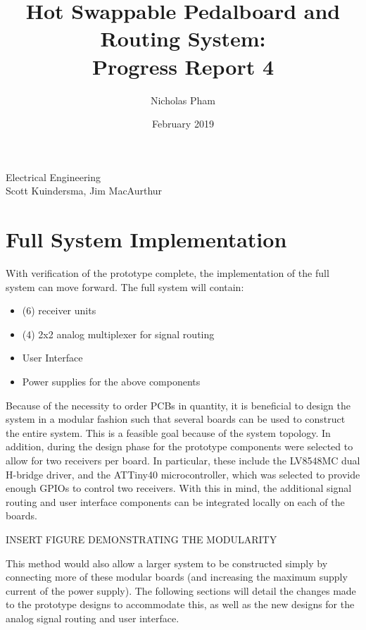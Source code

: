\documentclass{article}
\title{Hot Swappable Pedalboard and Routing System:\\Progress Report 4}
\author{Nicholas Pham}
\date{February 2019}
\begin{document}
\maketitle
\begin{center}
    Electrical Engineering \\
    Scott Kuindersma, Jim MacAurthur
\end{center}



% 
% 


\section{Full System Implementation}
	With verification of the prototype complete, the implementation of the full system can move forward.  The full system will contain:

	\begin{itemize}
		\item (6) receiver units
		\item (4) 2x2 analog multiplexer for signal routing
		\item User Interface
		\item Power supplies for the above components
	\end{itemize}

	Because of the necessity to order PCBs in quantity, it is beneficial to design the system in a modular fashion such that several boards can be used to construct the entire system.  This is a feasible goal because of the system topology.  In addition, during the design phase for the prototype components were selected to allow for two receivers per board.  In particular, these include the LV8548MC dual H-bridge driver, and the ATTiny40 microcontroller, which was selected to provide enough GPIOs to control two receivers.  With this in mind, the additional signal routing and user interface components can be integrated locally on each of the boards.

	INSERT FIGURE DEMONSTRATING THE MODULARITY

	This method would also allow a larger system to be constructed simply by connecting more of these modular boards (and increasing the maximum supply current of the power supply).  The following sections will detail the changes made to the prototype designs to accommodate this, as well as the new designs for the analog signal routing and user interface.
\end{document}
